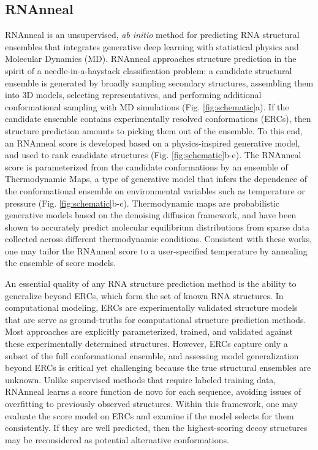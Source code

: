 \documentclass[%
aip,
 amsmath,amssymb,
reprint,%
twocolumn,
]{revtex4-1}
\begin{document}
\subsection*{RNAnneal}
RNAnneal is an unsupervised, {\it ab initio} method for predicting RNA structural ensembles that integrates generative deep learning with statistical physics and Molecular Dynamics (MD). RNAnneal approaches structure prediction in the spirit of a needle-in-a-haystack classification problem: a candidate structural ensemble is generated by broadly sampling secondary structures, assembling them into 3D models, selecting representatives, and performing additional conformational sampling with MD simulations (Fig. \ref{fig:schematic}a). If the candidate ensemble contains experimentally resolved conformations (ERCs), then structure prediction amounts to picking them out of the ensemble. To this end, an RNAnneal score is developed based on a physics-inspired generative model, and used to rank candidate structures (Fig. \ref{fig:schematic}b-e). The RNAnneal score is parameterized from the candidate conformations by an ensemble of Thermodynamic Maps, a type of generative model that infers the dependence of the conformational ensemble on environmental variables such as temperature or pressure (Fig. \ref{fig:schematic}b-c). Thermodynamic maps are probabilistic generative models based on the denoising diffusion framework\cite{sohl2015deep}, and have been shown to accurately predict molecular equilibrium distributions from sparse data collected across different thermodynamic conditions. \cite{herron2024inferring,lee2025exponentially,beyerle2025inferring} Consistent with these works, one may tailor the RNAnneal score to a user-specified temperature by annealing the ensemble of score models. 

An essential quality of any RNA structure prediction method is the ability to generalize beyond ERCs, which form the set of known RNA structures. In computational modeling, ERCs are experimentally validated structure models that are serve as ground-truths for computational structure prediction methods. Most approaches are explicitly parameterized, trained, and validated against these experimentally determined structures. However, ERCs capture only a subset of the full conformational ensemble, and assessing model generalization beyond ERCs is critical yet challenging because the true structural ensembles are unknown. Unlike supervised methods that require labeled training data, RNAnneal learns a score function de novo for each sequence, avoiding issues of overfitting to previously observed structures. Within this framework, one may evaluate the score model on ERCs and examine if the model selects for them consistently. If they are well predicted, then the highest-scoring decoy structures may be reconsidered as potential alternative conformations.
\end{document}

